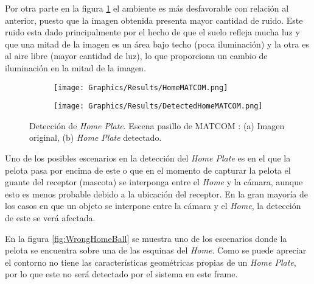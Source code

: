 Por otra parte en la figura \ref{fig:DetectedHomeMATCOM} el ambiente es más desfavorable con relación al anterior, puesto que la imagen obtenida presenta mayor cantidad de ruido. Este ruido esta dado principalmente por el hecho de que el suelo refleja mucha luz y que una mitad de la imagen es un área bajo techo (poca iluminación) y la otra es al aire libre (mayor cantidad de luz), lo que proporciona un cambio de iluminación en la mitad de la imagen.

\begin{figure}[h!]
    \centering
    \begin{subfigure}[b]{0.32\linewidth}
        \texttt{[image: Graphics/Results/HomeMATCOM.png]}
        \caption{}
    \end{subfigure}
    \begin{subfigure}[b]{0.32\linewidth}
        \texttt{[image: Graphics/Results/DetectedHomeMATCOM.png]}
        \caption{}
    \end{subfigure}
    \caption{Detección de \textit{Home Plate}. Escena pasillo de MATCOM : (a) Imagen original, (b)\textit{ Home Plate} detectado.}
    \label{fig:DetectedHomeMATCOM}
\end{figure}

Uno de los posibles escenarios en la detección del \textit{Home Plate} es en el que la pelota pasa por encima de este o que en el momento de capturar la pelota el guante del receptor (mascota) se interponga entre el \textit{Home} y la cámara, aunque esto es menos probable debido a la ubicación del receptor. En la gran mayoría de los casos en que un objeto se interpone entre la cámara y el \textit{Home}, la detección de este se verá afectada.

En la figura \ref{fig:WrongHomeBall} se muestra uno de los escenarios donde la pelota se encuentra sobre una de las esquinas del \textit{Home}. Como se puede apreciar el contorno no tiene las características geométricas propias de un \textit{Home Plate}, por lo que este no será detectado por el sistema en este frame.

